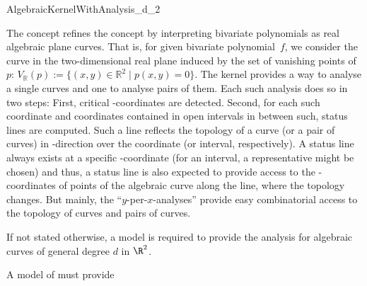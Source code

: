 \begin{ccRefConcept}{AlgebraicKernelWithAnalysis_d_2} 

\ccDefinition

The  concept refines
the  concept by interpreting bivariate polynomials
as real algebraic plane curves. That is, for given bivariate polynomial~$f$,
we consider the curve in the two-dimensional real plane induced by the set of
vanishing points of~$p$: $V_\mathbb{R}(p) := \{(x,y) \in \mathbb{R}^2
\mid p(x,y) = 0 \}$. The kernel provides a way to analyse a single
curves and one to analyse pairs of them. Each such analysis does so in two
steps: First, critical -coordinates are detected. Second, for each such
coordinate and coordinates contained in open
intervals in between such, status lines are computed. Such a line reflects
the topology of a curve (or a pair of curves) in -direction
over the coordinate (or interval, respectively). A status line always exists at
a specific -coordinate (for an interval, a representative might be
chosen) and thus, a status line is also expected to provide access to the
-coordinates of points of the algebraic curve along the line, where the
topology changes. But mainly, the ``$y$-per-$x$-analyses'' provide easy
combinatorial access to the topology of curves and pairs of curves. 

If not stated otherwise, a model is required to 
provide the analysis for algebraic curves of general degree $d$ in $\R^2$.

\ccRefines
{}

\ccTypes

A model of  must provide

\ccGlue
{}

\ccHasModels


\ccSeeAlso



\end{ccRefConcept}
